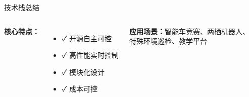 \documentclass[aspectratio=169]{beamer}
\begin{document}
\begin{frame}{技术栈总结}
\begin{columns}
        \vspace{0.3cm}
        \textbf{核心特点：}
        \begin{itemize}
            \item ✓ 开源自主可控
            \item ✓ 高性能实时控制
            \item ✓ 模块化设计
            \item ✓ 成本可控
        \end{itemize}
        
        \vspace{0.3cm}
        \begin{center}
            \textbf{应用场景：}智能车竞赛、两栖机器人、\\特殊环境巡检、教学平台
        \end{center}
    \end{columns}
\end{frame}
\end{document}
